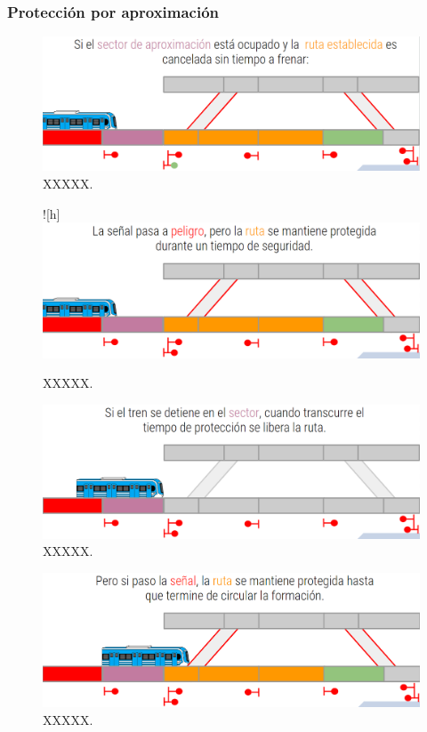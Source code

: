 \subsubsection{Protección por aproximación}

\lipsum[1]

    \begin{figure}[!h]
        \centering
        \includegraphics[width=1\textwidth]{Figuras/aproximacion_1}
        \centering\caption{XXXXX.}
        \label{fig:aproximacion_1}
    \end{figure}
    
\lipsum[1]

    \begin{figure}![h]
        \centering
        \includegraphics[width=1\textwidth]{Figuras/aproximacion_2}
        \centering\caption{XXXXX.}
        \label{fig:aproximacion_2}
    \end{figure}
    
\lipsum[1]

    \begin{figure}[!h]
        \centering
        \includegraphics[width=1\textwidth]{Figuras/aproximacion_3}
        \centering\caption{XXXXX.}
        \label{fig:aproximacion_3}
    \end{figure}
    
\lipsum[1]

    \begin{figure}[!h]
        \centering
        \includegraphics[width=1\textwidth]{Figuras/aproximacion_4}
        \centering\caption{XXXXX.}
        \label{fig:aproximacion_4}
    \end{figure}
    
\lipsum[1]